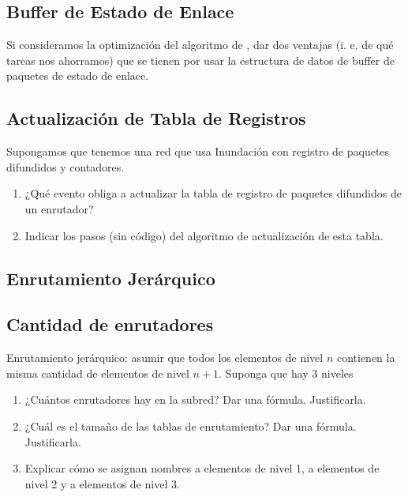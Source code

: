 \documentclass[12pt]{report}
\begin{document}
\begin{exer}
\subsection{Buffer de Estado de Enlace \stwo \steo}
Si consideramos la optimización del algoritmo de , dar dos ventajas (i. e. de qué tareas nos ahorramos) que se tienen por usar la estructura de datos de buffer de paquetes de estado de enlace.
\end{exer}

\begin{exer}
\subsection{Actualización de Tabla de Registros \stwo \steo}
Supongamos que tenemos una red que usa Inundación con registro de paquetes difundidos y contadores.

\begin{enumerate}
\item ¿Qué evento obliga a actualizar la tabla de registro de paquetes difundidos de un enrutador?
\item Indicar los pasos (sin código) del algoritmo de actualización de esta tabla.
\end{enumerate}
\end{exer}

\begin{exer}
\section{Enrutamiento Jerárquico}
\subsection{Cantidad de enrutadores \sthree}
Enrutamiento jerárquico: asumir que todos los elementos de nivel $n$ contienen la misma
cantidad de elementos de nivel $n+1$. Suponga que hay 3 niveles

\begin{enumerate}
\item ¿Cuántos enrutadores hay en la subred? Dar una fórmula. Justificarla.
\item ¿Cuál es el tamaño de las tablas de enrutamiento? Dar una fórmula. Justificarla.
\item Explicar cómo se asignan nombres a elementos de nivel 1, a elementos de nivel 2 y a elementos de nivel 3. 
\end{enumerate}
\end{exer}
\end{document}
